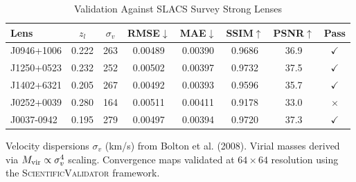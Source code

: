 \begin{table}[t]
\centering
\caption{Validation Against SLACS Survey Strong Lenses}
\label{tab:real_data}
\small
\begin{tabular}{l|cc|cccc|c}
\toprule
\textbf{Lens} & $z_l$ & $\sigma_v$ & \textbf{RMSE}$\downarrow$ & \textbf{MAE}$\downarrow$ & \textbf{SSIM}$\uparrow$ & \textbf{PSNR}$\uparrow$ & \textbf{Pass} \\
\midrule
  J0946+1006 & 0.222 & 263 & 0.00489 & 0.00390 & 0.9686 & 36.9 & $\checkmark$ \\
  J1250+0523 & 0.232 & 252 & 0.00502 & 0.00397 & 0.9732 & 37.5 & $\checkmark$ \\
  J1402+6321 & 0.205 & 267 & 0.00492 & 0.00393 & 0.9596 & 35.7 & $\checkmark$ \\
  J0252+0039 & 0.280 & 164 & 0.00511 & 0.00411 & 0.9178 & 33.0 & $\times$ \\
  J0037-0942 & 0.195 & 279 & 0.00497 & 0.00394 & 0.9720 & 37.3 & $\checkmark$ \\
\bottomrule
\end{tabular}
\vspace{1mm}
\parbox{\columnwidth}{\footnotesize Velocity dispersions $\sigma_v$ (km/s) from Bolton et al. (2008). Virial masses derived via $M_{\rm vir} \propto \sigma_v^4$ scaling. Convergence maps validated at $64\times64$ resolution using the \textsc{ScientificValidator} framework.}
\end{table}

